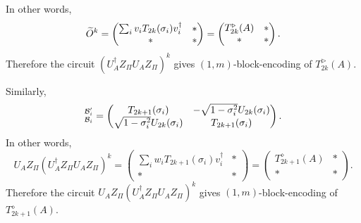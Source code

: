 In other words, 
\begin{equation}
\widetilde{O}^k=\begin{pmatrix}
\sum_{i} v_i T_{2k}(\sigma_i) v_i^{\dag} & *\\
* & *
\end{pmatrix}
=\begin{pmatrix}
T^{\triangleright}_{2k}(A) & *\\
* & *
\end{pmatrix}.
\end{equation}
Therefore the circuit $(U_A^{\dag}Z_{\Pi}U_A Z_{\Pi})^{k}$ gives $(1,m)$-block-encoding of $T_{2k}^{\triangleright}(A)$.

Similarly,
\begin{equation}
[U_A Z_{\Pi}(U_A^{\dag}Z_{\Pi}U_A Z_{\Pi})^{k}]_{\mc{B}_i}^{\mc{B}_{i}'}=\begin{pmatrix}
T_{2k+1}(\sigma_i) & -\sqrt{1-\sigma_i^2}U_{2k}(\sigma_i)\\
\sqrt{1-\sigma_i^2}U_{2k}(\sigma_i) & T_{2k+1}(\sigma_i)
\end{pmatrix}.
\end{equation}
In other words, \begin{equation}
U_A Z_{\Pi}(U_A^{\dag}Z_{\Pi}U_A Z_{\Pi})^{k}=\begin{pmatrix}
\sum_{i} w_i T_{2k+1}(\sigma_i) v_i^{\dag} & *\\
* & *
\end{pmatrix}
=\begin{pmatrix}
T^{\diamond}_{2k+1}(A) & *\\
* & *
\end{pmatrix}.
\end{equation}
Therefore the circuit $U_A Z_{\Pi}(U_A^{\dag}Z_{\Pi}U_A Z_{\Pi})^{k}$ gives $(1,m)$-block-encoding of $T_{2k+1}^{\diamond}(A)$. 

